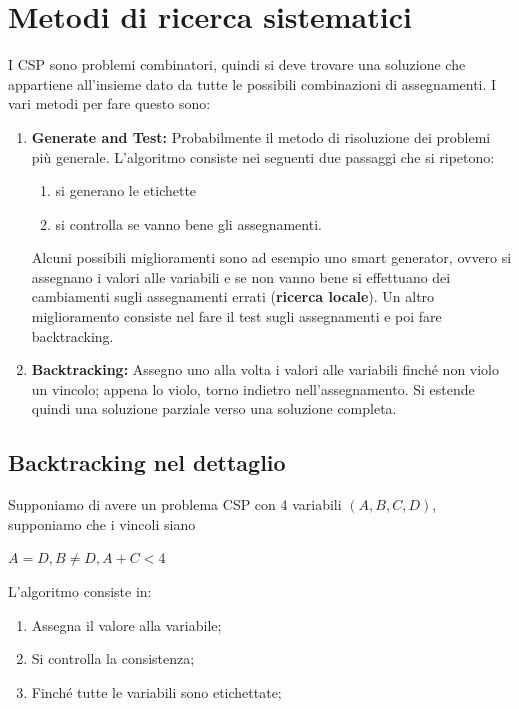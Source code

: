 \section{Metodi di ricerca sistematici}
I CSP sono problemi combinatori, quindi si deve trovare una soluzione che appartiene
all'insieme dato da tutte le possibili combinazioni di assegnamenti.
I vari metodi per fare questo sono:
\begin{enumerate}
    \item \textbf{Generate and Test: }Probabilmente il metodo di risoluzione dei
          problemi più generale. L'algoritmo consiste nei seguenti due passaggi che si
          ripetono:
          \begin{enumerate}
              \item si generano le etichette
              \item si controlla se vanno bene gli assegnamenti.
          \end{enumerate}
          Alcuni possibili miglioramenti sono ad esempio uno smart generator,
          ovvero si assegnano i valori alle variabili e se non vanno bene si
          effettuano dei cambiamenti sugli assegnamenti errati (\textbf{ricerca locale}).
          Un altro miglioramento consiste nel fare il test sugli assegnamenti e
          poi fare backtracking.
    \item \textbf{Backtracking:} Assegno uno alla volta i valori alle variabili
          finché non violo un vincolo; appena lo violo, torno indietro
          nell'assegnamento. Si estende quindi una soluzione parziale verso una
          soluzione completa.
\end{enumerate}


\subsection{Backtracking nel dettaglio}
Supponiamo di avere un problema CSP con 4 variabili $(A,B,C,D)$, supponiamo che i
vincoli siano
\begin{center}
    $A = D, B \neq D, A + C < 4$
\end{center}
L'algoritmo consiste in:
\begin{enumerate}
    \item Assegna il valore alla variabile;
    \item Si controlla la consistenza;
    \item Finché tutte le variabili sono etichettate;
\end{enumerate}

